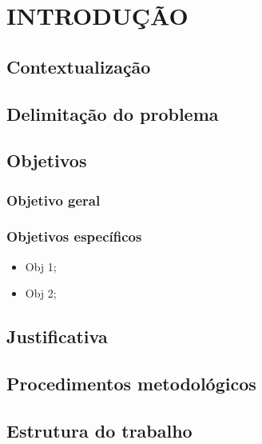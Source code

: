 \chapter{INTRODUÇÃO}

\section{Contextualização}
    
\section{Delimitação do problema}

\section{Objetivos}

\subsection{Objetivo geral}

\subsection{Objetivos específicos}
\begin{itemize}
    \item Obj 1;
    \item Obj 2;
\end{itemize}

\section{Justificativa}

\section{Procedimentos metodológicos}

\section{Estrutura do trabalho}
